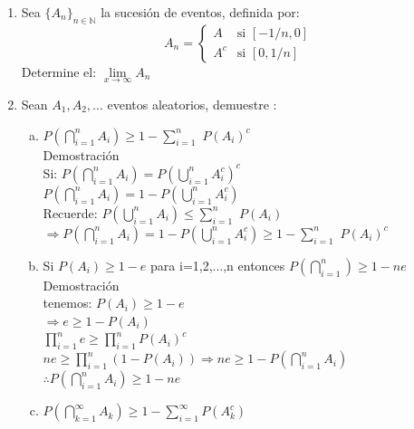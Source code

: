 \documentclass[12pt]{article}
\begin{document}
\begin{enumerate}
\item Sea $\{A_n\}_{n\in\mathbb{N}}$ la sucesión de eventos, definida por:
\[A_n = \begin{cases} 
  A  & \mbox{si } \left[-1/n,0\right]  \\[0.5cm]
  A^c  & \mbox{si } \left[0,1/n\right] \end{cases} \]
Determine el: $\lim\limits_{x \to \infty}A_n$

\item Sean $A_1,A_2,...$ eventos aleatorios, demuestre :
\begin{enumerate}[a)]
\item $P\left(\displaystyle\bigcap_{i=1}^{n}{A_i}\right)\geq 1-\displaystyle\sum_{i=1}^{n}$ $P\left(A_{i}\right)^c$\\[0.2cm]
Demostración\\[0.2cm]
Si: $P\left(\displaystyle\bigcap_{i=1}^{n}{A_i}\right)= P\left(\displaystyle\bigcup_{i=1}^{n}{A_i^c}\right)^c$\\[0.2cm]
$P\left(\displaystyle\bigcap_{i=1}^{n}{A_i}\right)= 1- P\left(\displaystyle\bigcup_{i=1}^{n}{A_i^c}\right)$\\[0.2cm]
Recuerde: $P\left(\displaystyle\bigcup_{i=1}^{n}{A_i}\right) \leqslant\displaystyle\sum_{i=1}^{n}$ $P\left(A_{i}\right)$\\[0.2cm]
$\Rightarrow P\left(\displaystyle\bigcap_{i=1}^{n}{A_i}\right)= 1- P\left(\displaystyle\bigcup_{i=1}^{n}{A_i^c}\right) \geqslant 1-\displaystyle\sum_{i=1}^{n}$ $P\left(A_{i}\right)^c $

\item Si $P\left(A_{i}\right) \geq 1-e$ para i=1,2,...,n entonces $P\left(\displaystyle\bigcap_{i=1}^{n}\right)\geq 1-ne$\\[0.2cm]

Demostración\\[0.2cm]
tenemos: $P\left(A_{i}\right)\geqslant 1-e$\\[0.2cm]
	$\Rightarrow e \geqslant 1-P\left(A_{i}\right)$\\[0.2cm]
	$ \displaystyle\prod_{i=1}^{n}e \geqslant \displaystyle\prod_{i=1}^{n}P\left(A_{i}\right)^c$\\[0.2cm]
$ne \geqslant \displaystyle\prod_{i=1}^{n}\left(1- P{\left(A_{i}\right)}\right)\Rightarrow ne\geqslant 1-P\left(\displaystyle\bigcap_{i=1}^{n}A_i\right)$ \\[0.2cm]
$\therefore P\left(\displaystyle\bigcap_{i=1}^{n}A_i\right)\geqslant 1-ne $
			 
		
\item $P\left(\displaystyle\bigcap_{k=1}^{\infty}{A_k}\right) \geqslant 1-\displaystyle\sum_{i=1}^{\infty}P\left(A_{k}^{c}\right) $
\end{enumerate}


\end{enumerate}
\end{document}
